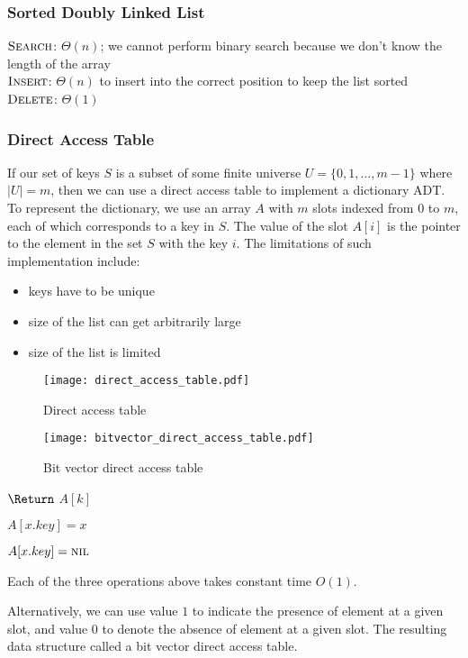 \subsubsection{Sorted Doubly Linked List}

$\textsc{Search}$: $\Theta(n)$; we cannot perform binary search because we don't know the length of the array \\
$\textsc{Insert}$: $\Theta(n)$ to insert into the correct position to keep the list sorted \\
$\textsc{Delete}$: $\Theta(1)$

\subsubsection{Direct Access Table} 

If our set of keys $S$ is a subset of some finite universe $U = \{ 0, 1, \ldots, m-1 \}$ where $|U| = m$, then we can use a direct access table to implement a dictionary ADT. To represent the dictionary, we use an array $A$ with $m$ slots indexed from 0 to $m$, each of which corresponds to a key in $S$. The value of the slot $A[i]$ is the pointer to the element in the set $S$ with the key $i$. The limitations of such implementation include:

\begin{itemize}
    \item keys have to be unique
    \item size of the list can get arbitrarily large
    \item size of the list is limited
\end{itemize}

\begin{figure}[htbp]
    \texttt{[image: direct\_access\_table.pdf]}
    \caption{Direct access table}
    \label{fig:direct_access_table}
\end{figure}

\begin{figure}[htbp]
    \texttt{[image: bitvector\_direct\_access\_table.pdf]}
    \caption{Bit vector direct access table}
    \label{fig:bitvector_direct_access_table}
\end{figure}

\begin{codebox}
    \li $\Return$ $A[k]$
\end{codebox}

\begin{codebox}
    \li $A[x.key] = x$
\end{codebox}

\begin{codebox}
    \li $A[x.key] = \textsc{nil}$
\end{codebox}

Each of the three operations above takes constant time $O(1)$.

Alternatively, we can use value $1$ to indicate the presence of element at a given slot, and value $0$ to denote the absence of element at a given slot. The resulting data structure called a bit vector direct access table. 